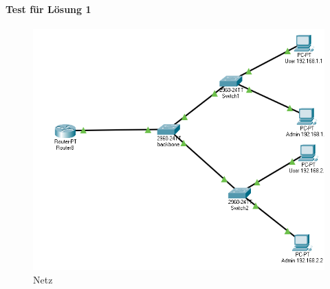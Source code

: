\paragraph{Test für Lösung 1}
\begin{figure}[!htb]
    \centering
    \includegraphics[width=\textwidth,height=.55\textwidth,keepaspectratio]{./img/test1/aufbau.png}
    \caption{Netz}
\end{figure}
